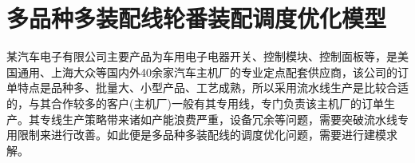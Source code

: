 \renewcommand{\labelenumi}{(\theenumi)}
\chapter{多品种多装配线轮番装配调度优化模型}
某汽车电子有限公司主要产品为车用电子电器开关、控制模块、控制面板等，是美国通用、上海大众等国内外40余家汽车主机厂的专业定点配套供应商，该公司的订单特点是品种多、批量大、小型产品、工艺成熟，所以采用流水线生产是比较合适的，与其合作较多的客户(主机厂)一般有其专用线，专门负责该主机厂的订单生产。其专线生产策略带来诸如产能浪费严重，设备冗余等问题，需要突破流水线专用限制来进行改善。如此便是多品种多装配线的调度优化问题，需要进行建模求解。
